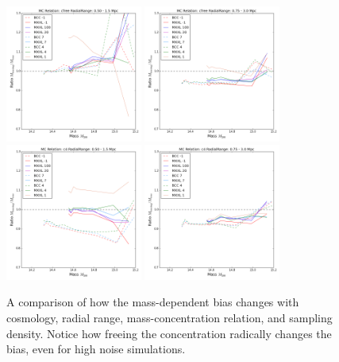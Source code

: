 \documentclass[11pt]{article}
\begin{document}
\begin{figure} \centering
\includegraphics[width=0.4\textwidth]{figures/density_cfree-r5}
\includegraphics[width=0.4\textwidth]{figures/density_cfree-r10}\\
\includegraphics[width=0.4\textwidth]{figures/density_c4-r5}
\includegraphics[width=0.4\textwidth]{figures/density_c4-r10}
\caption{A comparison of how the mass-dependent bias changes with cosmology, radial range, mass-concentration relation, and sampling density. Notice how freeing the concentration radically changes the bias, even for high noise simulations.}
\label{fig:profile_sensitivity_range_cosmo}
\end{figure}
\end{document}
